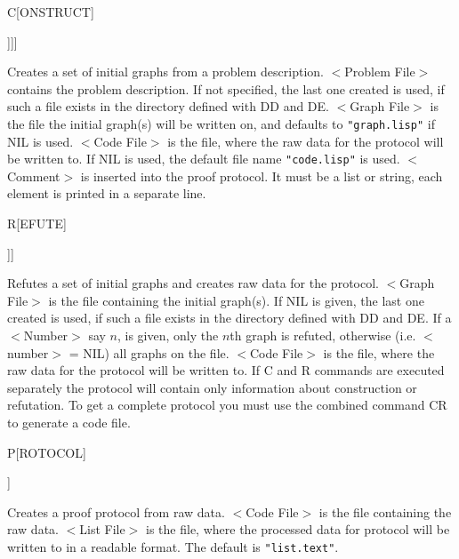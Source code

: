 \parbox[t]{4cm}{C[ONSTRUCT]

 
\quad [$<$Problem File$>$

\quad [$<$Graph File$>$

\quad [$<$Code File$>$ 	

\quad [$<$Comment$>$]]]]}
\hfill\parbox[t]{11cm}{Creates a set of initial graphs from a 
problem description.  $<$Problem File$>$ contains the problem
description. If not specified, the last one created is used, if such a
file exists in the directory defined with DD and DE.
$<$Graph File$>$ is the file the initial graph(s) will be
written on, and defaults to {\tt "graph.lisp"} if NIL is used.
$<$Code File$>$ is the file, where the raw data for the protocol
will be written to. If NIL is used,
the default file name {\tt "code.lisp"} is used.
$<$Comment$>$ is inserted into the proof protocol. It must be a list
or string, each element is printed in a separate line.}

\parbox[t]{4cm}{R[EFUTE]

 
\quad[$<$Graph File$>$

\quad[$<$Number$>$

\quad[$<$Code File$>$]]]}
\hfill\parbox[t]{11cm}{
Refutes a set of initial graphs and creates raw data for the
protocol. $<$Graph File$>$ is the file containing the initial
graph(s).  If NIL is given, the last one created is used, if such a file exists
in the directory defined with DD and DE.  If a $<$Number$>$ say $n$,
is given, only the $n$th graph is refuted, otherwise (i.e.
$<$number$>$ = NIL) all graphs on the file.  		$<$Code
File$>$ is the file, where the raw data for the protocol will
be written to. 
If C and R commands
are executed separately the protocol will contain only information
about construction or refutation. To get a complete protocol you must
use the combined command CR to generate a code file.}

\parbox[t]{4cm}{P[ROTOCOL]

\quad[$<$Code File$>$

\quad[$<$List File$>$]]}
\hfill\parbox[t]{11cm}{
Creates a proof protocol from raw data.
$<$Code File$>$ is the file containing the raw data.
$<$List File$>$ is the file, where the processed data for protocol
will be written to in a readable format.
The default is {\tt "list.text"}.}

